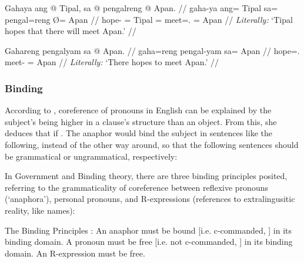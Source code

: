 \a\label{ex:subjctrl_2}\ljudge*\begingl
	\gla Gahaya ang @ Tipal, sa @ pengalreng {} @ Apan. //
	\glb gaha-ya ang= Tipal sa= pengal=reng Ø= Apan //
	\glc hope-\TsgM{} \Aarg{}= Tipal \PatT{}= meet=\TsgI{}.\Aarg{} \Top{}=
		Apan //
	\glft \textit{Literally:} `Tipal hopes that there will meet Apan.' //
\endgl

\a\label{ex:subjctrl_3}\ljudge*\begingl
	\gla Gahareng pengalyam sa @ Apan. //
	\glb gaha=reng pengal-yam sa= Apan //
	\glc hope=\TsgI{}.\Aarg{} meet-\Ptcp{} \Parg{}= Apan //
	\glft \textit{Literally:} `There hopes to meet Apan.' //
\endgl

\xe

\subsubsection{Binding}

According to \citep{speas1990}, coreference of pronouns in English can be
explained by the subject's being higher in a clause's structure than an object.
From this, she deduces that if . The anaphor would bind the
subject in sentences like the following, instead of the other way around, so
that the following sentences should be grammatical or ungrammatical,
respectively:

\pex\label{ex:flatbind}
	\a\label{ex:flatbind_1} 
	\a\label{ex:flatbind_2} \ljudge* {}
	\a\label{ex:flatbind_3} 
	\a\label{ex:flatbind_4} \ljudge* {}
\xe

In Government and Binding theory, there are three binding principles posited,
referring to the grammaticality of coreference between reflexive pronouns
(`ana\-phora'), personal pronouns, and R-expressions (references to
extralingusitic reality, like names):

\pex\label{ex:gbprinciples}
	The Binding Principles \citep[157]{carnie2013}:
	\a\label{ex:gb_a}%
		An anaphor must be bound [i.e. c-commanded, \CB] in its binding domain.
	\a\label{ex:gb_b}%
		A pronoun must be free [i.e. not c-commanded, \CB] in its binding
		domain.
	\a\label{ex:gb_c}%
		An R-expression must be free.
\xe


